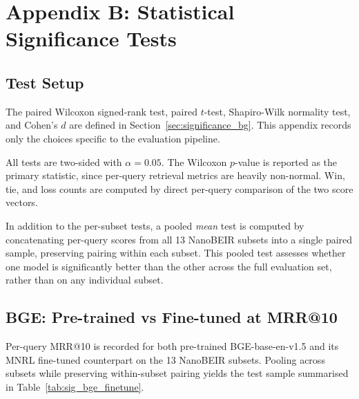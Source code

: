 
\chapter{Appendix B: Statistical Significance Tests}

\renewcommand{\thechapter}{B}

\section{Test Setup}
\label{sec:significance_setup}

The paired Wilcoxon signed-rank test, paired $t$-test, Shapiro-Wilk
normality test, and Cohen's $d$ are defined in
Section~\ref{sec:significance_bg}. This appendix records only the
choices specific to the evaluation pipeline.

All tests are two-sided with $\alpha = 0.05$. The Wilcoxon $p$-value is
reported as the primary statistic, since per-query retrieval metrics
are heavily non-normal. Win, tie, and loss counts are computed by
direct per-query comparison of the two score vectors.

In addition to the per-subset tests, a pooled \emph{mean} test is
computed by concatenating per-query scores from all 13 NanoBEIR subsets
into a single paired sample, preserving pairing within each subset.
This pooled test assesses whether one model is significantly better
than the other across the full evaluation set, rather than on any
individual subset.

\section{BGE: Pre-trained vs Fine-tuned at MRR@10}
\label{sec:significance_bge_finetune}

Per-query MRR@10 is recorded for both pre-trained BGE-base-en-v1.5 and
its MNRL fine-tuned counterpart on the 13 NanoBEIR subsets. Pooling
across subsets while preserving within-subset pairing yields the test
sample summarised in Table~\ref{tab:sig_bge_finetune}.


